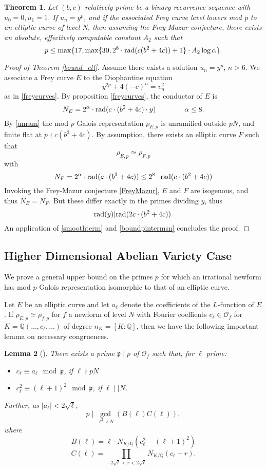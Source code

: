 \documentclass[12pt]{amsart}
\newtheorem{thm}{Theorem}[section]
\newtheorem{lem}[thm]{Lemma}
\theoremstyle{definition}
\def\O{{\mathcal O}}
\def\Q{{\mathbb Q}}
\newcommand{\rad}{{\rm{rad}}}
\renewcommand{\bar}{\overline}
\newcommand{\notdiv}{\nmid}
\begin{document}
\begin{thm}\label{ell_bound_final}
Let $(b,c)$ relatively prime be a binary recurrence sequence with $u_0=0,u_1=1$. If $u_n = y^p$, and if the associated Frey curve level lowers mod p to an elliptic curve of level N, then assuming the Frey-Mazur conjecture, there exists an absolute, effectively computable constant $A_2$ such that
\[ p \leq \max\{17, \max\{30, 2^8 \cdot \rad(c(b^2+4c))+1\} \cdot A_2\log{\alpha} \}. \]
\end{thm}
\begin{proof}[Proof of Theorem \ref{bound_ell}]
Assume there exists a solution $u_n = y^p$, $n > 6$.
We associate a Frey curve $E$ to the Diophantine equation
\[ y^{2p} +4(-c)^n = v_n^2 \]
as in \ref{freycurves}.  By proposition \ref{freycurves}, the conductor of $E$ is
\[ N_E = 2^{\alpha}  \cdot \rad( c \cdot (b^2+4c) \cdot y) \qquad \qquad \alpha \leq 8. \]
By \ref{unram} the mod $p$ Galois representation $\rho_{E,p}$ is unramified outside $pN$, and finite flat at $p \notdiv c(b^2+4c)$. By assumption, there exists an elliptic curve $F$ such that
\[ \rho_{E,p} \simeq \rho_{F,p} \]  
with
\[N_F = 2^{\alpha} \cdot  \rad( c \cdot (b^2+4c)) \leq 2^8 \cdot \rad(c \cdot (b^2+4c))  \]
Invoking the Frey-Mazur conjecture \ref{FreyMazur}, $E$ and $F$ are isogenous, and thus $N_E = N_F$.  But these differ exactly in the primes dividing $y$, thus
\[ \rad(y) | \rad(2c \cdot (b^2+4c)). \]
 An application of \ref{smoothterm} and \ref{boundpintermsn} concludes the proof.
\end{proof}


\subsection{Higher Dimensional Abelian Variety Case}
We prove a general upper bound on the primes $p$ for which an irrational newform has mod $p$ Galois representation isomorphic to that of an elliptic curve.
 
Let $E$ be an elliptic curve and let $a_\ell$ denote the coefficients of the $L$-function of $E$.  If $\rho_{E,p} \simeq \bar{\rho_{f,p}}$ for $f$ a newform of level $N$ with Fourier coeffients $c_\ell\in \O_f$ for $K =  \Q(...,c_\ell,...)$ of degree $n_K = [K:\mathbb{Q}]$, then we have the following important lemma on necessary congruences.

\begin{lem}[\cite{cohen07}]\label{ircong1}
There exists a prime $\mathfrak{p} \mid p$ of $\mathcal{O}_f$ such that, for $\ell$ prime:
\begin{itemize}
\item $c_\ell \equiv a_\ell \mod \mathfrak{p}$, if $\ell \nmid pN$
\item $c_\ell^2 \equiv (\ell+1)^2 \mod \mathfrak{p}$, if $\ell \mid\mid N$.
\end{itemize}
Further, as $|a_\ell| < 2\sqrt{\ell}$,
\[p \mid \gcd_{\ell^2 \nmid N}(B(\ell)C(\ell)), \] where
\[B(\ell) = \ell \cdot N_{K / \mathbb{Q}}(c_\ell^2-(\ell+1)^2) \]
\[C(\ell) = \prod_{-2\sqrt{\ell} < r < 2\sqrt{\ell}}{N_{K / \mathbb{Q}}}(c_\ell - r).\]
\end{lem}
\end{document}
